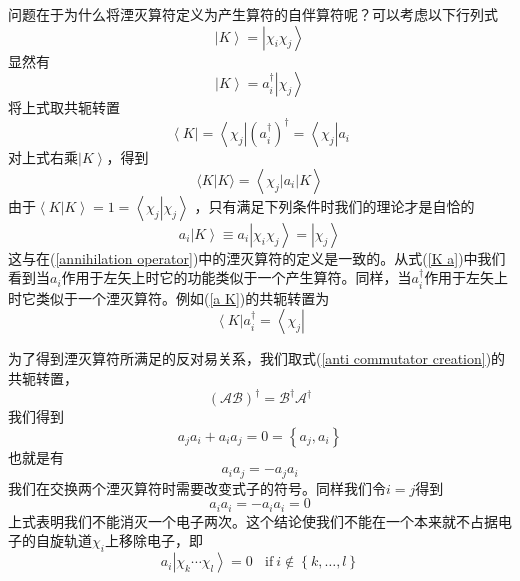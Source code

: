 \documentclass[12pt,a4paper,openany,twoside]{book}
\numberwithin{equation}{section}
\begin{document}
          问题在于为什么将湮灭算符定义为产生算符的自伴算符呢？可以考虑以下行列式
          \begin{equation}
            \left|K\right\rangle=\left|\chi_i\chi_j\right\rangle
          \end{equation}
          显然有
          \begin{equation}
            \left|K\right\rangle=a_i^\dagger\left|\chi_j\right\rangle
          \end{equation}
          将上式取共轭转置
          \begin{equation}
            \left\langle K\right|=\left\langle\chi_j\right|(a_i^\dagger)^\dagger=\left\langle\chi_j\right|a_i
            \label{K a}
          \end{equation}
          对上式右乘$\left|K\right\rangle$，得到
          \begin{equation}
            \langle K | K\rangle=\left\langle\chi_{j}\left|a_{i}\right| K\right\rangle
          \end{equation}
          由于$\left\langle K\right.\left|K\right\rangle=1=\left\langle \chi_j\right.\left|\chi_j\right\rangle$
          ，只有满足下列条件时我们的理论才是自恰的
          \begin{equation}
            a_i\left|K\right\rangle\equiv a_i\left|\chi_i\chi_j\right\rangle=\left|\chi_j\right\rangle
            \label{a K}
          \end{equation}
          这与在(\ref{annihilation operator})中的湮灭算符的定义是一致的。从式(\ref{K a})中我们看到当$a_i$作用于左矢上时它的功能类似于一个产生算符。同样，当$a_i^\dagger$作用于左矢上时它类似于一个湮灭算符。例如(\ref{a K})的共轭转置为
          \begin{equation}
            \left\langle K\right|a_i^\dagger=\left\langle\chi_j\right|
          \end{equation}
          
          为了得到湮灭算符所满足的反对易关系，我们取式(\ref{anti commutator creation})的共轭转置，
          \begin{equation}
            \left(\mathcal{AB}\right)^\dagger=\mathcal{B}^\dagger\mathcal{A}^\dagger
          \end{equation}
          我们得到
          \begin{equation}
            a_j a_i+a_i a_j=0=\left\{a_j, a_i\right\}
            \label{anti commutator annihilation}
          \end{equation}
          也就是有
          \begin{equation}
            a_i a_j=-a_j a_i
          \end{equation}
          我们在交换两个湮灭算符时需要改变式子的符号。同样我们令$i=j$得到
          \begin{equation}
            a_i a_i=-a_i a_i=0
          \end{equation}
          上式表明我们不能消灭一个电子两次。这个结论使我们不能在一个本来就不占据电子的自旋轨道$\chi_i$上移除电子，即
          \begin{equation}
            a_i\left|\chi_k\cdots\chi_l\right\rangle=0\ \ \ \ \mbox{if}\ i\notin
            \left\{k,\ldots,l\right\}
          \end{equation}
          
\end{document}
